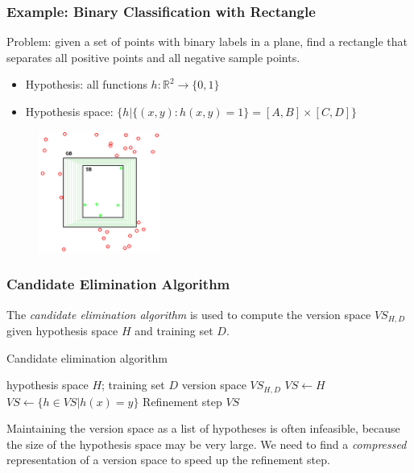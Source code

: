 \documentclass{beamer}
\begin{document}
\begin{frame}
\frametitle{Example: Binary Classification with Rectangle }
Problem: given a set of points with binary labels in a plane, find a rectangle that separates all positive points and all negative sample points.
\pause
\begin{itemize}
\item Hypothesis: all functions $h: \mathbb{R}^2 \rightarrow \{0, 1\}$
\item Hypothesis space: $\{h | \{(x, y): h(x, y) = 1\} = [A, B] \times [C, D]\}$
\end{itemize}
\pause
	\begin{figure}[h]
		\centering
		\includegraphics[width=4cm]{rect.png}
	\end{figure}
\end{frame}


\begin{frame}
	\frametitle{Candidate Elimination Algorithm}
	The \textit{candidate elimination algorithm} is used to compute the version space $VS_{H,D}$ given hypothesis space $H$ and training set $D$.
	\begin{algorithm}[H] 
		\caption{Candidate elimination algorithm} 
		\begin{algorithmic}[1] 
			\Require hypothesis space $H$; training set $D$
			\Ensure version space $VS_{H, D}$
			\State $VS \leftarrow H$
			\State $VS \leftarrow \{h \in VS | h(x) = y\}$ \Comment Refinement step
			\EndFor
			\State \Return $VS$
		\end{algorithmic} 
	\end{algorithm}
	\pause
	Maintaining the version space as a list of hypotheses is often infeasible, because the size of the hypothesis space may be very large. We need to find a \textit{compressed} representation of a version space to speed up the refinement step.
\end{frame}
\end{document}
